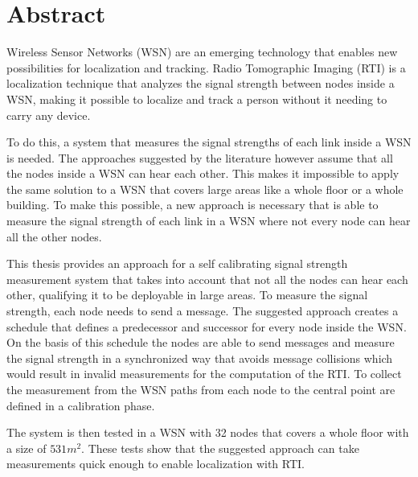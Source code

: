 
\cleardoublepage

\section*{Abstract}
Wireless Sensor Networks (WSN) are an emerging technology that enables new possibilities for localization and tracking. Radio Tomographic Imaging (RTI) is a localization technique that analyzes the signal strength between nodes inside a WSN, making it possible to localize and track a person without it needing to carry any device.

To do this, a system that measures the signal strengths of each link inside a WSN is needed. The approaches suggested by the literature however assume that all the nodes inside a WSN can hear each other. This makes it impossible to apply the same solution to a WSN that covers large areas like a whole floor or a whole building. To make this possible, a new approach is necessary that is able to measure the signal strength of each link in a WSN where not every node can hear all the other nodes.

This thesis provides an approach for a self calibrating signal strength measurement system that takes into account that not all the nodes can hear each other, qualifying it to be deployable in large areas. To measure the signal strength, each node needs to send a message. The suggested approach creates a schedule that defines a predecessor and successor for every node inside the WSN. On the basis of this schedule the nodes are able to send messages and measure the signal strength in a synchronized way that avoids message collisions which would result in invalid measurements for the computation of the RTI. To collect the measurement from the WSN paths from each node to the central point are defined in a calibration phase. 

The system is then tested in a WSN with 32 nodes that covers a whole floor with a size of $531 m^2$. These tests show that the suggested approach can take measurements quick enough to enable localization with RTI.
\cleardoublepage
